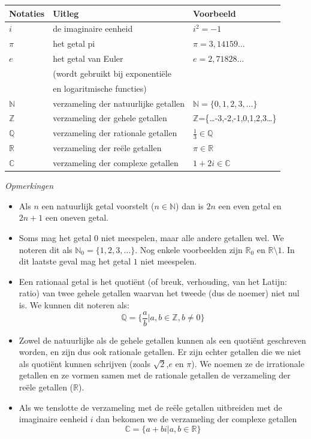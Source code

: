 \begin{center}
	\begin{tabular}{lll}
		Notaties & Uitleg & Voorbeeld \\
		\hline
		$i$ & de imaginaire eenheid & $i^2=-1$ \\
		$\pi$ & het getal pi & $\pi=3,14159\ldots$ \\
		$e$ & het getal van Euler & $e=2,71828\ldots$\\
		& (wordt gebruikt bij exponenti\"ele & \\
		&  en logaritmische functies) & \\
		$\mathbb{N}$ & verzameling der natuurlijke getallen & $\mathbb{N}=\{0,1,2,3,\ldots\}$ \\
		$\mathbb{Z}$ & verzameling der gehele getallen & $\mathbb{Z}$=\{\ldots-3,-2,-1,0,1,2,3\ldots\}\\
		$\mathbb{Q}$ & verzameling der rationale getallen & $\frac{1}{3}\in \mathbb{Q}$ \\
		$\mathbb{R}$ & verzameling der re\"ele getallen & $\pi \in \mathbb{R}$ \\
		$\mathbb{C}$ & verzameling der complexe getallen & $1+2i \in \mathbb{C}$
	\end{tabular}
\end{center}

\emph{Opmerkingen}

\begin{itemize}
	\item Als $n$ een natuurlijk getal voorstelt ($n \in \mathbb{N}$) dan is $2n$ een even getal en $2n+1$ een oneven getal.
	\item Soms mag het getal $0$ niet meespelen, maar alle andere getallen wel.  We noteren dit als  $\mathbb{N}_0=\{1,2,3,\ldots\}$. Nog enkele voorbeelden zijn $\mathbb{R}_0$ en $\mathbb{R} \setminus {1}$.  In dit laatste geval mag het getal $1$ niet meespelen.
	\item Een rationaal getal is het quoti\"ent (of breuk, verhouding, van het Latijn: ratio) van twee gehele getallen waarvan het tweede (dus de noemer) niet nul is.  We kunnen dit noteren als:
	\begin{equation*}
	\mathbb{Q}=\{\frac{a}{b}|a,b\in \mathbb{Z}, b \ne 0\}
	\end{equation*}
	\item Zowel de natuurlijke als de gehele getallen kunnen als een quoti\"ent geschreven worden, en zijn dus ook rationale getallen.  Er zijn echter getallen die we niet als quoti\"ent kunnen schrijven (zoals $\sqrt{2}$,$e$ en $\pi$). We noemen ze de irrationale getallen en ze vormen samen met de rationale getallen de verzameling der re\"ele getallen ($\mathbb{R}$).
	\item Als we tenslotte de verzameling met de re\"ele getallen uitbreiden met de imaginaire eenheid $i$ dan bekomen we de verzameling der complexe getallen
	\begin{equation*}
	\mathbb{C} = \{a+bi|a,b \in \mathbb{R}\}
	\end{equation*}
\end{itemize}

